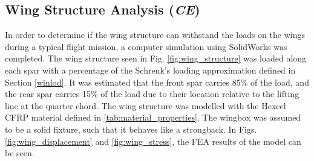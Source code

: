 \subsection{Wing Structure Analysis (\textit{CE})}
In order to determine if the wing structure can withstand the loads on the wings during a typical flight mission, a computer simulation using SolidWorks was completed. The wing structure seen in Fig. \ref{fig:wing_structure} was loaded along each spar with a percentage of the Schrenk's loading approximation defined in Section \ref{winlod}. It was estimated that the front spar carries 85\% of the load, and the rear spar carries 15\% of the load due to their location relative to the lifting line at the quarter chord. The wing structure was modelled with the Hexcel CFRP material defined in \ref{tab:material_properties}. The wingbox was assumed to be a solid fixture, such that it behaves like a strongback. In Figs. \ref{fig:wing_displacement} and \ref{fig:wing_stress}, the FEA results of the model can be seen.

